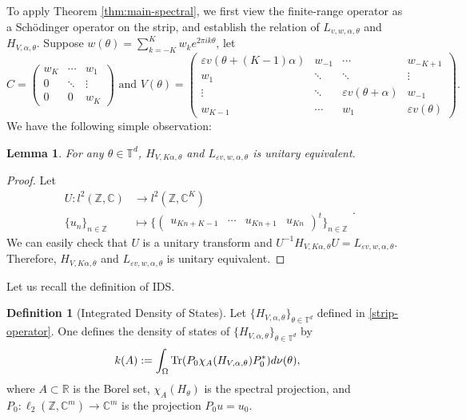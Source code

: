 \documentclass[11pt]{amsart}
\newtheorem{lemma}[theorem]{Lemma}
\theoremstyle{remark}
\theoremstyle{definition}
\newtheorem{definition}{Definition}
\newcommand{\T}{{\mathbf T}}
\newcommand{\RR}{{\mathbb R}}
\newcommand{\TT}{{\mathbb T}}
\newcommand{\tr}{{\rm Tr}}
\def\T{{\mathbb T}}
\begin{document}
To apply Theorem \ref{thm:main-spectral}, we first view the 
finite-range operator as a Sch\"odinger operator on the strip, and establish the relation of ${L}_{v,w,\alpha,\theta}$ and ${H}_{V,\alpha,\theta}$.
 Suppose $w(\theta)=\sum_{k=-K}^Kw_ke^{2\pi ik\theta}$, let	$$
C=\begin{pmatrix}
	w_K&\cdots&w_1\\
	0&\ddots&\vdots\\
	0&0&w_K
\end{pmatrix}
\text{ and }  
	V(\theta)=\begin{pmatrix}
		\varepsilon v (\theta+(K-1)\alpha)&w_{-1}&\cdots&w_{-K+1}\\
		w_1&\ddots&\ddots&\vdots\\
		\vdots&\ddots&\varepsilon v (\theta+\alpha)&w_{-1}\\
		w_{K-1}&\cdots&w_1&\varepsilon v(\theta)
	\end{pmatrix}.
$$
We have the following simple observation:	
\begin{lemma}\label{uni}
For any $\theta\in\TT^d$, ${H}_{V,K\alpha,\theta}$ and ${L}_{\varepsilon v,w,\alpha,\theta}$ is unitary equivalent.
 \end{lemma}	
\begin{proof}
	Let $$\begin{aligned}
U:l^2(\mathbb{Z},\mathbb{C})&\rightarrow l^2(\mathbb{Z},\mathbb{C}^K)\\
\{u_n\}_{n\in\mathbb{Z}}&\mapsto\bigg\{\begin{pmatrix}
	u_{Kn+K-1}&\cdots&u_{Kn+1}&u_{Kn}
\end{pmatrix}^t\bigg\}_{n\in\mathbb{Z}}
	\end{aligned}.$$
	We can easily check that $U$ is a unitary transform and
	$
		U^{-1}{{H}_{V,K\alpha,\theta}}U
		=	{L}_{\varepsilon v,w,\alpha,\theta} 
	$.
	Therefore, ${H}_{V,K\alpha,\theta}$ and ${L}_{\varepsilon v,w,\alpha,\theta}$ is unitary equivalent.
\end{proof}
Let us recall the definition of IDS.
\begin{definition}[Integrated Density of States] 
	Let $\{{H}_{V,\alpha,\theta}\}_{\theta\in\T^d}$ defined in \eqref{strip-operator}. One defines the density of states of $\{{H}_{V,\alpha,\theta}\}_{\theta\in\T^d}$ by
	\begin{equation*}
		k(A) :=  \int_{\Omega} \tr(P_0\chi_A(H_{V,\alpha,\theta})P_0^*) d\nu(\theta),
	\end{equation*}
	where $A \subset \RR$ is the Borel set, $\chi_A(H_\theta)$ is the spectral projection,   and $P_0:\ell_2(\mathbb{Z},\mathbb{C}^m)\rightarrow \mathbb{C}^m$ is the projection $P_0u=u_0$.
\end{definition}
\end{document}
